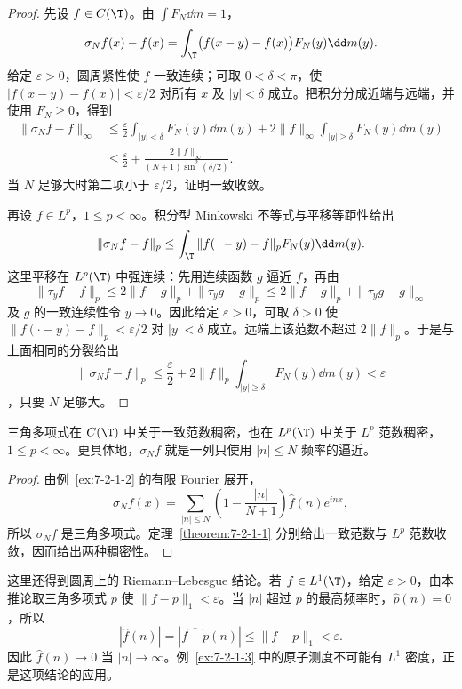 \begin{proof}
先设 $f\in C(\T)$。由 $\int F_N\dd m=1$，
\begin{equation}\label{eq:7-2-fejer-difference}
 \sigma_Nf(x)-f(x)
 =\int_\T\bigl(f(x-y)-f(x)\bigr)F_N(y)\dd m(y).
\end{equation}
给定 $\varepsilon>0$，圆周紧性使 $f$ 一致连续；可取 $0<\delta<\pi$，使
$|f(x-y)-f(x)|<\varepsilon/2$ 对所有 $x$ 及 $|y|<\delta$ 成立。把积分分成近端与远端，并使用
$F_N\geq0$，得到
\begin{align*}
 \|\sigma_Nf-f\|_\infty
 &\leq \frac\varepsilon2\int_{|y|<\delta}F_N(y)\dd m(y)
 +2\|f\|_\infty\int_{|y|\geq\delta}F_N(y)\dd m(y)\\
 &\leq\frac\varepsilon2
 +\frac{2\|f\|_\infty}{(N+1)\sin^2(\delta/2)}.
\end{align*}
当 $N$ 足够大时第二项小于 $\varepsilon/2$，证明一致收敛。

再设 $f\in L^p$，$1\leq p<\infty$。积分型 Minkowski 不等式与平移等距性给出
\begin{equation}\label{eq:7-2-fejer-lp}
 \|\sigma_Nf-f\|_p
 \leq\int_\T\|f(\,\cdot-y)-f\|_pF_N(y)\dd m(y).
\end{equation}
这里平移在 $L^p(\T)$ 中强连续：先用连续函数 $g$ 逼近 $f$，再由
\[
 \|\tau_yf-f\|_p
 \leq2\|f-g\|_p+\|\tau_yg-g\|_p
 \leq2\|f-g\|_p+\|\tau_yg-g\|_\infty
\]
及 $g$ 的一致连续性令 $y\to0$。因此给定 $\varepsilon>0$，可取 $\delta>0$ 使
$\|f(\cdot-y)-f\|_p<\varepsilon/2$ 对 $|y|<\delta$ 成立。远端上该范数不超过
$2\|f\|_p$。于是与上面相同的分裂给出
\[
 \|\sigma_Nf-f\|_p
 \leq\frac\varepsilon2
 +2\|f\|_p\int_{|y|\geq\delta}F_N(y)\dd m(y)<\varepsilon
\]
，只要 $N$ 足够大。
\end{proof}

\begin{corollary}\label{corollary:7-2-1-2}
三角多项式在 $C(\T)$ 中关于一致范数稠密，也在 $L^p(\T)$ 中关于 $L^p$ 范数稠密，
$1\leq p<\infty$。更具体地，$\sigma_Nf$ 就是一列只使用 $|n|\leq N$ 频率的逼近。
\end{corollary}

\begin{proof}
由例~\ref{ex:7-2-1-2} 的有限 Fourier 展开，
\[
 \sigma_Nf(x)
 =\sum_{|n|\leq N}\left(1-\frac{|n|}{N+1}\right)\widehat f(n)e^{inx},
\]
所以 $\sigma_Nf$ 是三角多项式。定理~\ref{theorem:7-2-1-1} 分别给出一致范数与
$L^p$ 范数收敛，因而给出两种稠密性。
\end{proof}

这里还得到圆周上的 Riemann--Lebesgue 结论。若 $f\in L^1(\T)$，给定
$\varepsilon>0$，由本推论取三角多项式 $p$ 使 $\|f-p\|_1<\varepsilon$。当 $|n|$ 超过
$p$ 的最高频率时，$\widehat p(n)=0$，所以
\[
 |\widehat f(n)|=|\widehat{f-p}(n)|\leq\|f-p\|_1<\varepsilon.
\]
因此 $\widehat f(n)\to0$ 当 $|n|\to\infty$。例~\ref{ex:7-2-1-3} 中的原子测度不可能有
$L^1$ 密度，正是这项结论的应用。

